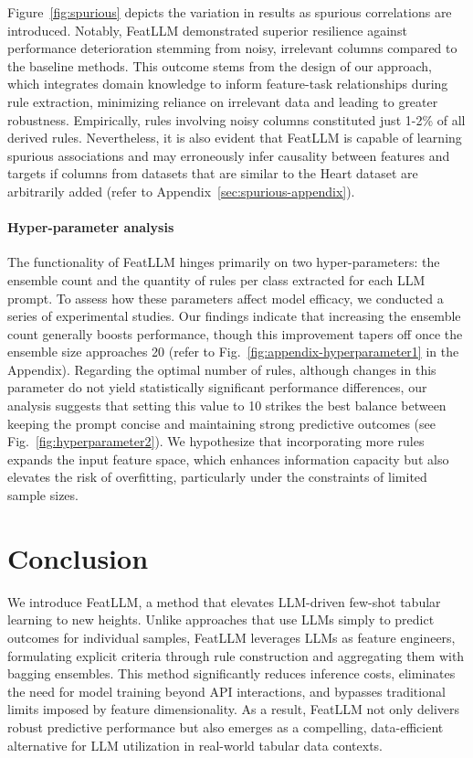 Figure~\ref{fig:spurious} depicts the variation in results as spurious correlations are introduced. Notably, \textsf{FeatLLM} demonstrated superior resilience against performance deterioration stemming from noisy, irrelevant columns compared to the baseline methods. This outcome stems from the design of our approach, which integrates domain knowledge to inform feature-task relationships during rule extraction, minimizing reliance on irrelevant data and leading to greater robustness. Empirically, rules involving noisy columns constituted just 1-2\% of all derived rules. Nevertheless, it is also evident that \textsf{FeatLLM} is capable of learning spurious associations and may erroneously infer causality between features and targets if columns from datasets that are similar to the Heart dataset are arbitrarily added (refer to Appendix~\ref{sec:spurious-appendix}).

\vspace*{-0.12in}
\paragraph{Hyper-parameter analysis}
The functionality of \textsf{FeatLLM} hinges primarily on two hyper-parameters: the ensemble count and the quantity of rules per class extracted for each LLM prompt. To assess how these parameters affect model efficacy, we conducted a series of experimental studies. Our findings indicate that increasing the ensemble count generally boosts performance, though this improvement tapers off once the ensemble size approaches 20 (refer to Fig.~\ref{fig:appendix-hyperparameter1} in the Appendix). Regarding the optimal number of rules, although changes in this parameter do not yield statistically significant performance differences, our analysis suggests that setting this value to 10 strikes the best balance between keeping the prompt concise and maintaining strong predictive outcomes (see Fig.~\ref{fig:hyperparameter2}). We hypothesize that incorporating more rules expands the input feature space, which enhances information capacity but also elevates the risk of overfitting, particularly under the constraints of limited sample sizes.

\section{Conclusion}
We introduce \textsf{FeatLLM}, a method that elevates LLM-driven few-shot tabular learning to new heights. Unlike approaches that use LLMs simply to predict outcomes for individual samples, \textsf{FeatLLM} leverages LLMs as feature engineers, formulating explicit criteria through rule construction and aggregating them with bagging ensembles. This method significantly reduces inference costs, eliminates the need for model training beyond API interactions, and bypasses traditional limits imposed by feature dimensionality. As a result, \textsf{FeatLLM} not only delivers robust predictive performance but also emerges as a compelling, data-efficient alternative for LLM utilization in real-world tabular data contexts.

